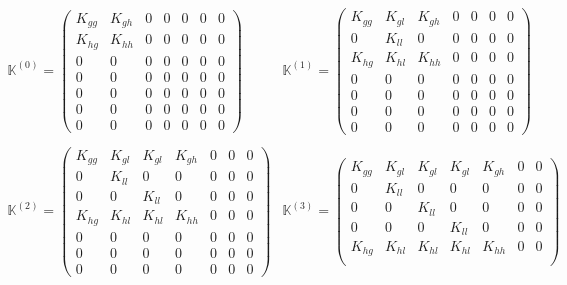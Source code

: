 \documentclass[10pt,a4paper]{article}
\begin{document}
\begin{equation}\label{eq:MathcingMatrices}
\begin{array}{ll}
\mathbb{K}^{(0)} = 
\begin{pmatrix}
K_{gg} & K_{gh} & 0  & 0  & 0  & 0  & 0 \\
K_{hg} & K_{hh} & 0  & 0  & 0  & 0  & 0 \\
0 & 0 & 0  & 0  & 0  & 0  & 0 \\
0 & 0 & 0  & 0  & 0  & 0  & 0 \\
0 & 0 & 0  & 0  & 0  & 0  & 0 \\
0 & 0 & 0  & 0  & 0  & 0  & 0 \\
0 & 0 & 0  & 0  & 0  & 0  & 0
\end{pmatrix}
&
\mathbb{K}^{(1)} = 
\begin{pmatrix}
K_{gg} & K_{gl} & K_{gh} & 0  & 0  & 0  & 0 \\
0 & K_{ll} & 0 & 0  & 0  & 0  & 0  \\
K_{hg} & K_{hl} & K_{hh}  & 0  & 0  & 0  & 0 \\
0 & 0 & 0  & 0  & 0  & 0  & 0 \\
0 & 0 & 0  & 0  & 0  & 0  & 0 \\
0 & 0 & 0  & 0  & 0  & 0  & 0 \\
0 & 0 & 0  & 0  & 0  & 0  & 0
\end{pmatrix}
\\ \\
\mathbb{K}^{(2)} = 
\begin{pmatrix}
K_{gg} & K_{gl} & K_{gl} & K_{gh} & 0  & 0  & 0 \\
0 & K_{ll} & 0 & 0  & 0  & 0  & 0  \\
0 & 0 & K_{ll} & 0  & 0  & 0  & 0  \\
K_{hg} & K_{hl} & K_{hl} & K_{hh}  & 0  & 0  & 0 \\
0 & 0 & 0  & 0  & 0  & 0  & 0 \\
0 & 0 & 0  & 0  & 0  & 0  & 0 \\
0 & 0 & 0  & 0  & 0  & 0  & 0
\end{pmatrix}
&
\mathbb{K}^{(3)} = 
\begin{pmatrix}
K_{gg} & K_{gl} & K_{gl} & K_{gl} & K_{gh}  & 0  & 0 \\
0 & K_{ll} & 0 & 0  & 0  & 0  & 0  \\
0 & 0 & K_{ll} & 0  & 0  & 0  & 0  \\
0 & 0 & 0 & K_{ll} & 0  & 0  & 0  \\
K_{hg} & K_{hl} & K_{hl} & K_{hl} & K_{hh}  & 0  & 0 \\

\end{pmatrix}
\end{array}
\end{equation}
\end{document}
